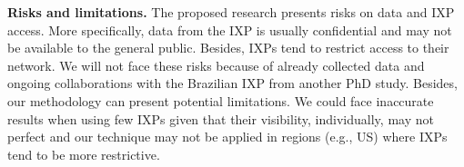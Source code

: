 	\textbf{Risks and limitations.} The proposed research presents risks on data and IXP access. More specifically, data from the IXP is usually confidential and may not be available to the general public. Besides, IXPs tend to restrict access to their network. We will not face these risks because of already collected data and ongoing collaborations with the Brazilian IXP from another PhD study. Besides, our methodology can present potential limitations. We could face inaccurate results when using few IXPs given that their visibility, individually, may not perfect and our technique may not be applied in regions (e.g., US) where IXPs tend to be more restrictive. 
